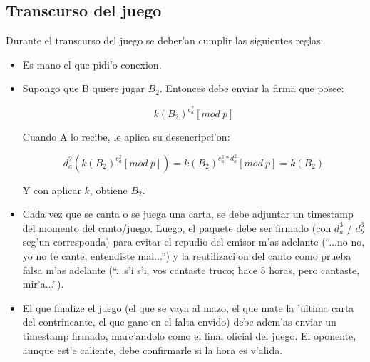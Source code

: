 \subsection{Transcurso del juego}
Durante el transcurso del juego se deber'an cumplir las siguientes reglas:

\begin{itemize}
\item Es mano el que pidi'o conexion.

\item Supongo que B quiere jugar $B_2$. Entonces debe enviar la firma que posee:

$$	k(B_2)^{e^2_a} [mod\ p] $$
	
Cuando A lo recibe, le aplica su desencripci'on:

$$	d^2_a(k(B_2)^{e^2_a} [mod\ p]) = 
	k(B_2)^{e^2_a * d^2_a} [mod\ p] = 
	k(B_2) $$

Y con aplicar $k$, obtiene $B_2$.

\item Cada vez que se canta o se juega una carta, se debe adjuntar un timestamp del momento del canto/juego. Luego, el paquete debe ser firmado (con $d^3_a$ / $d^3_b$ seg'un corresponda) para evitar el repudio del emisor m'as adelante (``...no no, yo no te cante, entendiste mal...'') y la reutilizaci'on del canto como prueba falsa m'as adelante (``...s'i s'i, vos cantaste truco; hace 5 horas, pero cantaste, mir'a...'').

\item El que finalize el juego (el que se vaya al mazo, el que mate la 'ultima carta del contrincante, el que gane en el falta envido) debe adem'as enviar un timestamp firmado, marc'andolo como el final oficial del juego. El oponente, aunque est'e caliente, debe confirmarle si la hora es v'alida.

\end{itemize}
